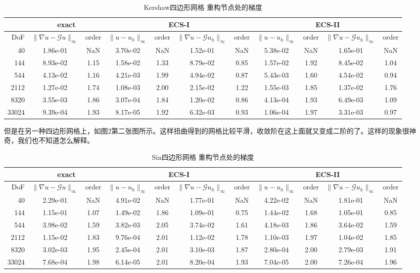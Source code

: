 \documentclass[12pt,a4paper]{article}
\theoremstyle{plain}
\begin{document}
\begin{table}[h]
\centering
\scriptsize
\begin{tabular}{r|cc|cc|cc|cc|cc}
\hline
& \multicolumn{2}{c|}{exact} & \multicolumn{4}{c}{ECS-I} & \multicolumn{4}{|c}{ECS-II} \\
\hline
DoF & $\|\nabla u - \mathcal{G} u\|_\infty$ & order & $\|u - u_h\|_\infty$ & order & $\|\nabla u - \mathcal{G} u_h\|_\infty$ & order & $\|u - u_h\|_\infty$ & order & $\|\nabla u - \mathcal{G} u_h\|_\infty$ & order \\
\hline
40 & 1.86e-01 & NaN & 3.70e-02 & NaN & 1.52e-01 & NaN & 5.38e-02 & NaN & 1.65e-01 & NaN \\
144 & 8.93e-02 & 1.15 & 1.58e-02 & 1.33 & 8.79e-02 & 0.85 & 1.57e-02 & 1.92 & 8.45e-02 & 1.04 \\
544 & 4.13e-02 & 1.16 & 4.21e-03 & 1.99 & 4.94e-02 & 0.87 & 5.43e-03 & 1.60 & 4.54e-02 & 0.94 \\
2112 & 1.27e-02 & 1.74 & 1.08e-03 & 2.00 & 2.15e-02 & 1.22 & 1.55e-03 & 1.85 & 1.37e-02 & 1.76 \\
8320 & 3.55e-03 & 1.86 & 3.07e-04 & 1.84 & 1.20e-02 & 0.86 & 4.13e-04 & 1.93 & 6.49e-03 & 1.09 \\
33024 & 9.39e-04 & 1.93 & 8.17e-05 & 1.92 & 6.32e-03 & 0.93 & 1.06e-04 & 1.97 & 3.31e-03 & 0.97 \\
\hline
\end{tabular}
\caption{Kershaw四边形网格 重构节点处的梯度}
\end{table}

但是在另一种四边形网格上，如图2第二张图所示。这样扭曲得到的网格比较平滑，收敛阶在这上面就又变成二阶的了。这样的现象很神奇，我们也不知道怎么解释。

\begin{table}[h]
\centering
\scriptsize
\begin{tabular}{r|cc|cc|cc|cc|cc}
\hline
& \multicolumn{2}{c|}{exact} & \multicolumn{4}{c}{ECS-I} & \multicolumn{4}{|c}{ECS-II} \\
\hline
DoF & $\|\nabla u - \mathcal{G} u\|_\infty$ & order & $\|u - u_h\|_\infty$ & order & $\|\nabla u - \mathcal{G} u_h\|_\infty$ & order & $\|u - u_h\|_\infty$ & order & $\|\nabla u - \mathcal{G} u_h\|_\infty$ & order \\
\hline
40 & 2.29e-01 & NaN & 4.91e-02 & NaN & 1.77e-01 & NaN & 4.22e-02 & NaN & 1.81e-01 & NaN \\
144 & 1.15e-01 & 1.07 & 1.49e-02 & 1.86 & 1.09e-01 & 0.75 & 1.44e-02 & 1.68 & 1.05e-01 & 0.85 \\
544 & 3.98e-02 & 1.59 & 3.82e-03 & 2.05 & 3.74e-02 & 1.61 & 4.18e-03 & 1.86 & 3.64e-02 & 1.59 \\
2112 & 1.15e-02 & 1.83 & 9.76e-04 & 2.01 & 1.12e-02 & 1.78 & 1.10e-03 & 1.97 & 1.04e-02 & 1.85 \\
8320 & 3.02e-03 & 1.95 & 2.45e-04 & 2.01 & 3.10e-03 & 1.87 & 2.80e-04 & 2.00 & 2.79e-03 & 1.91 \\
33024 & 7.68e-04 & 1.98 & 6.14e-05 & 2.01 & 8.20e-04 & 1.93 & 7.04e-05 & 2.00 & 7.26e-04 & 1.96 \\
\hline
\end{tabular}
\caption{Sin四边形网格 重构节点处的梯度}
\end{table}
\end{document}
